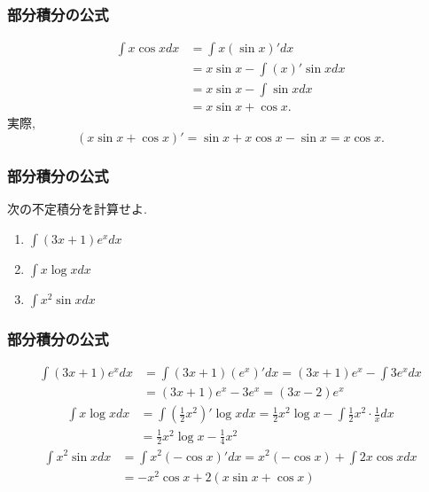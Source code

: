 


\begin{frame}
\frametitle{部分積分の公式}

\begin{align*}
\int x \cos x dx & = \int x(\sin x)' dx\\
& = x \sin x - \int (x)' \sin x dx \\
& = x \sin x - \int \sin x dx \\
&= x \sin x + \cos x. 
\end{align*}
実際,
$$
(x \sin x + \cos x)' = \sin x + x \cos x -\sin x=x \cos x. 
$$

\end{frame}





\begin{frame}
\frametitle{部分積分の公式}

\begin{Prob}
次の不定積分を計算せよ. 
\begin{enumerate}
\item $\int (3x+1)e^{x}dx$
\item $\int x \log x dx$
\item $\int x^2 \sin x dx$
\end{enumerate}
\end{Prob}

\end{frame}






\begin{frame}
\frametitle{部分積分の公式}


\begin{align*}
\int (3x+1)e^{x}dx & = \int (3x+1) (e^{x})'dx = (3x+1)e^x -\int 3 e^x dx \\
& = (3x+1)e^x-3e^x=(3x-2)e^x
\end{align*}
\begin{align*}
\int x \log x dx & = \int (\frac{1}{2}x^2)'\log x dx = \frac{1}{2}x^2 \log x - \int \frac{1}{2}x^2 \cdot \frac{1}{x}dx \\
& =  \frac{1}{2}x^2 \log x -\frac{1}{4}x^2
\end{align*}
\begin{align*}
\int x^2 \sin x dx & = \int x^2(-\cos x)'dx = x^2(-\cos x) + \int 2x \cos x dx \\
& = -x^2 \cos x +2(x\sin x + \cos x)
\end{align*}


\end{frame}


